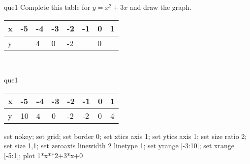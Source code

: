 \documentclass[13.5pt, varwidth=true]{beamer}
\begin{document}
\begin{frame}[shrink=19,fragile]
	\begin{beamercolorbox}[rounded=true, left, shadow=true,wd=14.8cm]{que1}
		 Complete this table for $y = x^{2} + 3x$ and draw the graph. \\[0.3cm] \renewcommand{\arraystretch}{1.2}\begin{tabular}{|C|C|C|C|C|C|C|C|} \hline x & -5 & -4 & -3 & -2 & -1 & 0 & 1 \\ \hline y &  & 4 & 0 & -2 &  & 0 & \\ \hline \end{tabular}\\[0.3cm]
	\end{beamercolorbox}
\end{frame}
\begin{frame}[shrink=19,fragile]
	\begin{beamercolorbox}[rounded=true, left, shadow=true,wd=14.8cm]{que1}
		\renewcommand{\arraystretch}{1.2}\begin{tabular}{|C|C|C|C|C|C|C|C|} \hline x & -5 & -4 & -3 & -2 & -1 & 0 & 1 \\ \hline y & 10 & 4 & 0 & -2 & -2 & 0 & 4\\ \hline \end{tabular}\begin{gnuplot}[terminal=pdf] set nokey; set grid; set border 0; set xtics axis 1; set ytics axis 1; set size ratio 2; set size 1,1; set zeroaxis linewidth 2 linetype 1; set yrange [-3:10]; set xrange [-5:1]; plot 1*x**2+3*x+0 \end{gnuplot}
	\end{beamercolorbox}
\end{frame}
\end{document}
